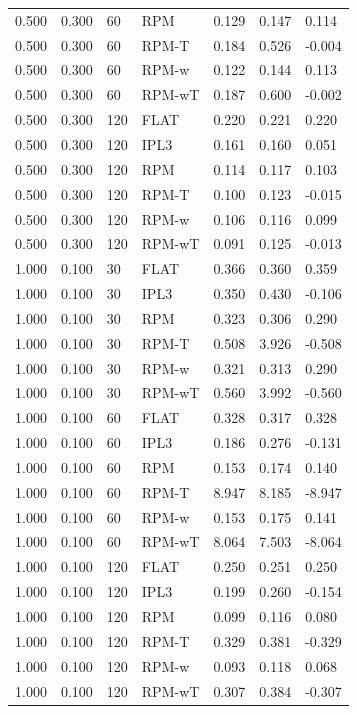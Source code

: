 \begin{tabular}{lllllll}
0.500 & 0.300 & 60 & RPM & 0.129 & 0.147 & 0.114 \\
0.500 & 0.300 & 60 & RPM-T & 0.184 & 0.526 & -0.004 \\
0.500 & 0.300 & 60 & RPM-w & 0.122 & 0.144 & 0.113 \\
0.500 & 0.300 & 60 & RPM-wT & 0.187 & 0.600 & -0.002 \\
0.500 & 0.300 & 120 & FLAT & 0.220 & 0.221 & 0.220 \\
0.500 & 0.300 & 120 & IPL3 & 0.161 & 0.160 & 0.051 \\
0.500 & 0.300 & 120 & RPM & 0.114 & 0.117 & 0.103 \\
0.500 & 0.300 & 120 & RPM-T & 0.100 & 0.123 & -0.015 \\
0.500 & 0.300 & 120 & RPM-w & 0.106 & 0.116 & 0.099 \\
0.500 & 0.300 & 120 & RPM-wT & 0.091 & 0.125 & -0.013 \\
1.000 & 0.100 & 30 & FLAT & 0.366 & 0.360 & 0.359 \\
1.000 & 0.100 & 30 & IPL3 & 0.350 & 0.430 & -0.106 \\
1.000 & 0.100 & 30 & RPM & 0.323 & 0.306 & 0.290 \\
1.000 & 0.100 & 30 & RPM-T & 0.508 & 3.926 & -0.508 \\
1.000 & 0.100 & 30 & RPM-w & 0.321 & 0.313 & 0.290 \\
1.000 & 0.100 & 30 & RPM-wT & 0.560 & 3.992 & -0.560 \\
1.000 & 0.100 & 60 & FLAT & 0.328 & 0.317 & 0.328 \\
1.000 & 0.100 & 60 & IPL3 & 0.186 & 0.276 & -0.131 \\
1.000 & 0.100 & 60 & RPM & 0.153 & 0.174 & 0.140 \\
1.000 & 0.100 & 60 & RPM-T & 8.947 & 8.185 & -8.947 \\
1.000 & 0.100 & 60 & RPM-w & 0.153 & 0.175 & 0.141 \\
1.000 & 0.100 & 60 & RPM-wT & 8.064 & 7.503 & -8.064 \\
1.000 & 0.100 & 120 & FLAT & 0.250 & 0.251 & 0.250 \\
1.000 & 0.100 & 120 & IPL3 & 0.199 & 0.260 & -0.154 \\
1.000 & 0.100 & 120 & RPM & 0.099 & 0.116 & 0.080 \\
1.000 & 0.100 & 120 & RPM-T & 0.329 & 0.381 & -0.329 \\
1.000 & 0.100 & 120 & RPM-w & 0.093 & 0.118 & 0.068 \\
1.000 & 0.100 & 120 & RPM-wT & 0.307 & 0.384 & -0.307 \\

\end{tabular}
